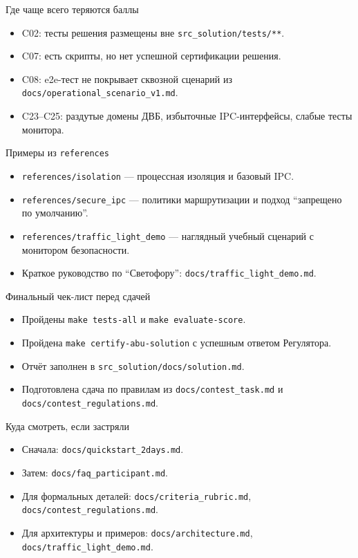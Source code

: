 \documentclass[aspectratio=169]{beamer}
\begin{document}
\begin{frame}{Где чаще всего теряются баллы}
  \begin{itemize}
    \item C02: тесты решения размещены вне \texttt{src\_solution/tests/**}.
    \item C07: есть скрипты, но нет успешной сертификации решения.
    \item C08: e2e-тест не покрывает сквозной сценарий из \texttt{docs/operational\_scenario\_v1.md}.
    \item C23--C25: раздутые домены ДВБ, избыточные IPC-интерфейсы, слабые тесты монитора.
  \end{itemize}
\end{frame}

\begin{frame}{Примеры из \texttt{references}}
  \begin{itemize}
    \item \texttt{references/isolation} --- процессная изоляция и базовый IPC.
    \item \texttt{references/secure\_ipc} --- политики маршрутизации и подход ``запрещено по умолчанию''.
    \item \texttt{references/traffic\_light\_demo} --- наглядный учебный сценарий с монитором безопасности.
    \item Краткое руководство по ``Светофору'': \texttt{docs/traffic\_light\_demo.md}.
  \end{itemize}
\end{frame}

\begin{frame}{Финальный чек-лист перед сдачей}
  \begin{itemize}
    \item Пройдены \texttt{make tests-all} и \texttt{make evaluate-score}.
    \item Пройдена \texttt{make certify-abu-solution} с успешным ответом Регулятора.
    \item Отчёт заполнен в \texttt{src\_solution/docs/solution.md}.
    \item Подготовлена сдача по правилам из \texttt{docs/contest\_task.md} и \texttt{docs/contest\_regulations.md}.
  \end{itemize}
\end{frame}

\begin{frame}{Куда смотреть, если застряли}
  \begin{itemize}
    \item Сначала: \texttt{docs/quickstart\_2days.md}.
    \item Затем: \texttt{docs/faq\_participant.md}.
    \item Для формальных деталей: \texttt{docs/criteria\_rubric.md}, \texttt{docs/contest\_regulations.md}.
    \item Для архитектуры и примеров: \texttt{docs/architecture.md}, \texttt{docs/traffic\_light\_demo.md}.
  \end{itemize}
\end{frame}
\end{document}
